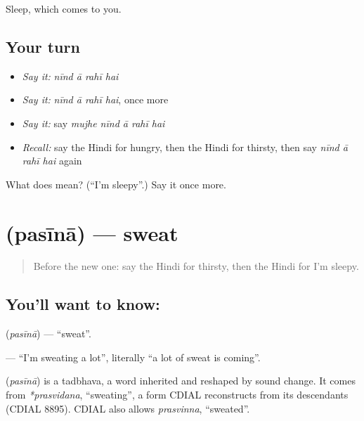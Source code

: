 \begin{grammarlens}[title={What you've built}]
Sleep, which comes to you.
\end{grammarlens}

\subsection*{Your turn}
\begin{itemize}
\raggedright
  \item \emph{Say it:} \emph{nīnd ā rahī hai}
  \item \emph{Say it:} \emph{nīnd ā rahī hai}, once more
  \item \emph{Say it:} say \emph{mujhe nīnd ā rahī hai}
  \item \emph{Recall:} say the Hindi for hungry, then the Hindi for thirsty, then say \emph{nīnd ā rahī hai} again
\end{itemize}

\begin{tcolorbox}[breakable,colback=teal!4,colframe=teal!35!black,title={Before you move on}]
What does     mean? (\textquotedblleft{}I'm sleepy\textquotedblright{}.) Say it once more.
\end{tcolorbox}
\section[\texorpdfstring{\hi{पसीना} (pasīnā)}{पसीना (pasīnā)}]{ (pasīnā) — sweat}

\label{lesson:HI-C124-pasina}



\begin{quote}
Before the new one: say the Hindi for thirsty, then the Hindi for I'm sleepy.
\end{quote}

\subsection*{You'll want to know: }
\textbf{} (\emph{pasīnā}) — \textquotedblleft{}sweat\textquotedblright{}.

\textbf{    } — \textquotedblleft{}I'm sweating a lot\textquotedblright{}, literally \textquotedblleft{}a lot of sweat is coming\textquotedblright{}.

\begin{cousinweb}
\textbf{} (\emph{pasīnā}) is a tadbhava, a word inherited and reshaped by sound change. It comes from \emph{*prasvidana}, \textquotedblleft{}sweating\textquotedblright{}, a form CDIAL reconstructs from its descendants (CDIAL 8895). CDIAL also allows \emph{prasvinna}, \textquotedblleft{}sweated\textquotedblright{}.
\end{cousinweb}

